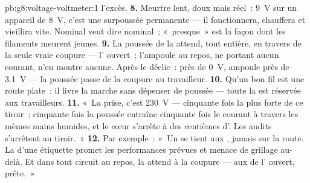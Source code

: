 \begin{solution}{pb:g8:voltage-voltmeter:1}
l'excès.
\textbf{8.} Meurtre lent, doux mais réel~: \qty{9}{V} sur un appareil
de \qty{8}{V}, c'est une surpoussée permanente --- il fonctionnera,
chauffera et vieillira vite. Nominal veut dire nominal~; «~presque~»
est la façon dont les filaments meurent jeunes.
\textbf{9.} La poussée de la  attend, tout entière, en travers de
la seule vraie coupure --- l' ouvert~; l'ampoule au
repos, ne portant aucun courant, n'en montre aucune. Après le
déclic~:  près de \qty{0}{V}, ampoule près de
\qty{3.1}{V} --- la poussée passe de la coupure au travailleur.
\textbf{10.} Qu'un bon fil est une route plate~: il livre la marche
sans dépenser de poussée --- toute la  est réservée aux
travailleurs.
\textbf{11.} «~La prise, c'est \qty{230}{V} --- cinquante fois la
plus forte  de ce tiroir~; cinquante fois la poussée entraîne
cinquante fois le courant à travers les mêmes mains humides, et le
cœur s'arrête à des centièmes d'. Les audits s'arrêtent au
tiroir.~»
\textbf{12.} Par exemple~: «~Un  se tient aux ,
jamais sur la route. La  d'une étiquette promet les
performances prévues et menace de grillage au-delà. Et dans tout
circuit au repos, la  attend à la coupure --- aux  de
l' ouvert, prête.~»
\end{solution}
